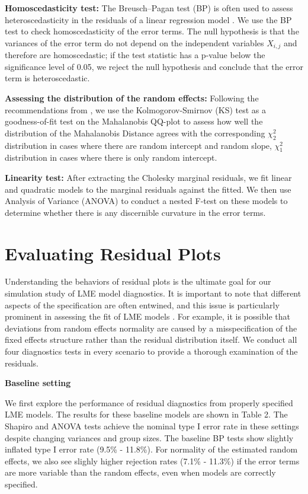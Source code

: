 \documentclass[12pt]{article}
\begin{document}
\textbf{Homoscedasticity test:} The Breusch--Pagan test (BP) is often
used to assess heteroscedasticity in the residuals of a linear
regression model \citep{breusch1979simple}. We use the BP test to check
homoscedasticity of the error terms. The null hypothesis is that the
variances of the error term do not depend on the independent variables
\(X_{i,j}\) and therefore are homoscedastic; if the test statistic has a
p-value below the significance level of 0.05, we reject the null
hypothesis and conclude that the error term is heteroscedastic.

\textbf{Assessing the distribution of the random effects:} Following the
recommendations from \citet{Singer2017-sd}, we use the
Kolmogorov-Smirnov (KS) test as a goodness-of-fit test on the
Mahalanobis QQ-plot to assess how well the distribution of the
Mahalanobis Distance agrees with the corresponding \(\chi^2_2\)
distribution in cases where there are random intercept and random slope,
\(\chi^2_1\) distribution in cases where there is only random intercept.

\textbf{Linearity test:} After extracting the Cholesky marginal
residuals, we fit linear and quadratic models to the marginal residuals
against the fitted. We then use Analysis of Variance (ANOVA)
\citep{bates1992statistical} to conduct a nested F-test on these models
to determine whether there is any discernible curvature in the error
terms.

\section{Evaluating Residual Plots}

Understanding the behaviors of residual plots is the ultimate goal for
our simulation study of LME model diagnostics. It is important to note
that different aspects of the specification are often entwined, and this
issue is particularly prominent in assessing the fit of LME models
\citep{Snijders2008-dm}. For example, it is possible that deviations
from random effects normality are caused by a misspecification of the
fixed effects structure \citep{mcculloch2011misspecifying} rather than
the residual distribution itself. We conduct all four diagnostics tests
in every scenario to provide a thorough examination of the residuals.

\textbf{Baseline setting}

We first explore the performance of residual diagnostics from properly
specified LME models. The results for these baseline models are shown in
Table 2. The Shapiro and ANOVA tests achieve the nominal type I error
rate in these settings despite changing variances and group sizes. The
baseline BP tests show slightly inflated type I error rate (9.5\% -
11.8\%). For normality of the estimated random effects, we also see
slighly higher rejection rates (7.1\% - 11.3\%) if the error terms are
more variable than the random effects, even when models are correctly
specified.
\end{document}
